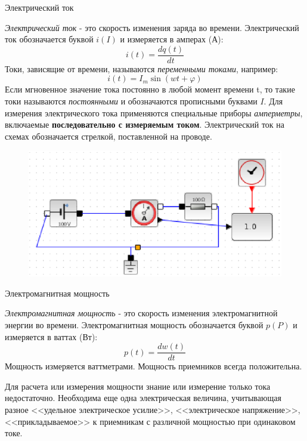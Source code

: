 \documentclass[12pt, pdf, hyperref={unicode},handout]{beamer}
\begin{document}
\begin{frame}{Электрический ток}
  \begin{block}

    \small{
\textit{Электрический ток} - это скорость изменения заряда во времени. Электрический ток обозначается буквой $i (I)$ и измеряется в амперах (А): $$i(t)=\frac{d q(t)}{d t}$$
Токи, зависящие от времени, называются \textit{переменными токами}, например: $$i(t)=I_m\sin(wt+\varphi)$$
Если мгновенное значение тока постоянно в любой момент времени t, то такие токи называются \textit{постоянными} и обозначаются прописными буквами $I$. Для измерения электрического тока применяются специальные приборы \textit{амперметры}, включаемые \textbf{последовательно с измеряемым током}. Электрический ток на схемах обозначается стрелкой, поставленной на проводе.
\begin{figure}[htb] 
    \centering
    \includegraphics [scale=0.9]{ris1.eps}
  \end{figure}

}

  \end{block}
  
\end{frame}

\begin{frame}{Электромагнитная мощность}
  \begin{block}

    \small{
\textit{Электромагнитная мощность} - это скорость изменения электромагнитной энергии во времени. Электромагнитная мощность  обозначается буквой $p (P)$ и измеряется в ваттах (Вт): $$p(t)=\frac{d w(t)}{d t}$$
Мощность измеряется ваттметрами. Мощность приемников всегда положительна.

Для расчета или измерения мощности знание или измерение только тока недостаточно. Необходима еще одна электрическая величина, учитывающая разное <<удельное электрическое усилие>>, <<электрическое напряжение>>, <<прикладываемое>> к приемникам с различной мощностью при одинаковом токе.


}

  \end{block}
  
\end{frame}
\end{document}
